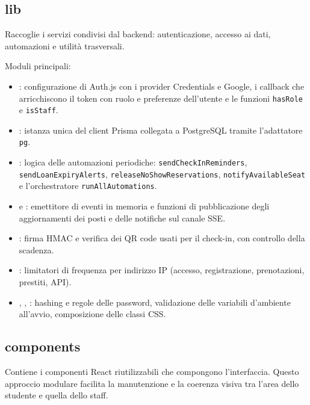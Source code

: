 \documentclass[11pt,a4paper,oneside,openany]{book}
\begin{document}

\subsection{lib}

Raccoglie i servizi condivisi dal backend: autenticazione, accesso ai dati,
automazioni e utilità trasversali.

Moduli principali:
\begin{itemize}
  \item {}: configurazione di Auth.js con i provider Credentials e
        Google, i callback che arricchiscono il token con ruolo e preferenze
        dell'utente e le funzioni \texttt{hasRole} e \texttt{isStaff}.
  \item {}: istanza unica del client Prisma collegata a
        PostgreSQL tramite l'adattatore \texttt{pg}.
  \item {}: logica delle automazioni periodiche:
        \texttt{sendCheckInReminders}, \texttt{sendLoanExpiryAlerts},
        \texttt{releaseNoShowReservations}, \texttt{notifyAvailableSeat} e
        l'orchestratore \texttt{runAllAutomations}.
  \item {} e : emettitore di
        eventi in memoria e funzioni di pubblicazione degli aggiornamenti dei
        posti e delle notifiche sul canale SSE.
  \item {}: firma HMAC e verifica dei QR code usati per il
        check-in, con controllo della scadenza.
  \item {}: limitatori di frequenza per indirizzo IP
        (accesso, registrazione, prenotazioni, prestiti, API).
  \item {}, , : hashing e
        regole delle password, validazione delle variabili d'ambiente
        all'avvio, composizione delle classi CSS.
\end{itemize}


\subsection{components}

Contiene i componenti React riutilizzabili che compongono l'interfaccia.
Questo approccio modulare facilita la manutenzione e la coerenza visiva tra
l'area dello studente e quella dello staff.
\end{document}
